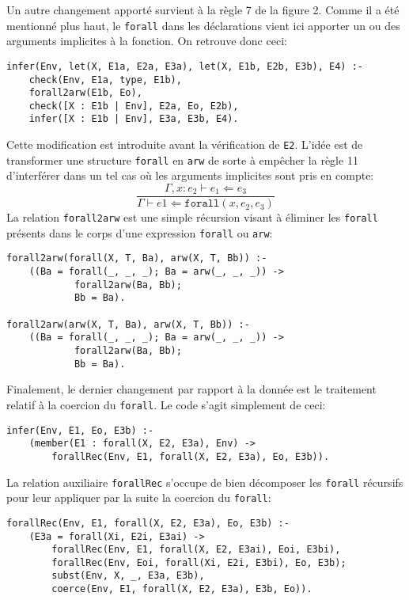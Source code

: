 \documentclass[12pt, titlepage]{article}
\begin{document}
Un autre changement apporté survient à la règle 7 de la figure 2. Comme il a
été mentionné plus haut, le \texttt{forall} dans les déclarations vient ici
apporter un ou des arguments implicites à la fonction. On retrouve donc ceci:
\begin{lstlisting}
infer(Env, let(X, E1a, E2a, E3a), let(X, E1b, E2b, E3b), E4) :-
    check(Env, E1a, type, E1b),
    forall2arw(E1b, Eo),
    check([X : E1b | Env], E2a, Eo, E2b),
    infer([X : E1b | Env], E3a, E3b, E4).
\end{lstlisting}
Cette modification est introduite avant la vérification de \texttt{E2}. L'idée
est de transformer une structure \texttt{forall} en \texttt{arw} de sorte à
empêcher la règle 11 d'interférer dans un tel cas où les arguments implicites
sont pris en compte:
\begin{equation}
    \frac {\Gamma,x : e_2 \vdash e_1 \Leftarrow e_3}
    {\Gamma \vdash e1 \Leftarrow \texttt{forall}(x, e_2, e_3)} \tag{11}
\end{equation}
La relation \texttt{forall2arw} est une simple récursion visant à éliminer les
\texttt{forall} présents dans le corps d'une expression \texttt{forall} ou
\texttt{arw}:
\begin{lstlisting}
forall2arw(forall(X, T, Ba), arw(X, T, Bb)) :-
    ((Ba = forall(_, _, _); Ba = arw(_, _, _)) ->
            forall2arw(Ba, Bb);
            Bb = Ba).

forall2arw(arw(X, T, Ba), arw(X, T, Bb)) :-
    ((Ba = forall(_, _, _); Ba = arw(_, _, _)) ->
            forall2arw(Ba, Bb);
            Bb = Ba).
\end{lstlisting}

Finalement, le dernier changement par rapport à la donnée est le traitement
relatif à la coercion du \texttt{forall}. Le code s'agit simplement de ceci:
\begin{lstlisting}
infer(Env, E1, Eo, E3b) :-
    (member(E1 : forall(X, E2, E3a), Env) ->
        forallRec(Env, E1, forall(X, E2, E3a), Eo, E3b)).
\end{lstlisting}
La relation auxiliaire \texttt{forallRec} s'occupe de bien décomposer les
\texttt{forall} récursifs pour leur appliquer par la suite la coercion du 
\texttt{forall}:
\begin{lstlisting}
forallRec(Env, E1, forall(X, E2, E3a), Eo, E3b) :-
    (E3a = forall(Xi, E2i, E3ai) ->
        forallRec(Env, E1, forall(X, E2, E3ai), Eoi, E3bi),
        forallRec(Env, Eoi, forall(Xi, E2i, E3bi), Eo, E3b);
        subst(Env, X, _, E3a, E3b),
        coerce(Env, E1, forall(X, E2, E3a), E3b, Eo)).
\end{lstlisting}
\end{document}
